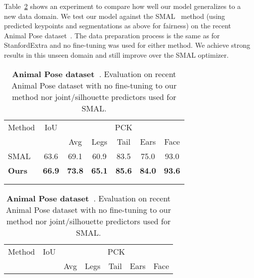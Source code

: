   Table~\ref{tab:animalpose} shows an experiment to compare how well our model generalizes to a new data domain. We test our model against the SMAL~\cite{DBLP:journals/corr/ZuffiKJB16} method (using predicted keypoints and segmentations as above for fairness) on the recent Animal Pose dataset~\cite{animalpose}. The data preparation process is the same as for StanfordExtra and no fine-tuning was used for either method. We achieve strong results in this unseen domain and still improve over the SMAL optimizer.
  
  \begin{table}[t!]
      \parbox{.45\linewidth}{
          \centering
          \begin{tabular}{@{}lcccccc@{}}
          \toprule
          \multicolumn{1}{l}{Method} & 
          \multicolumn{1}{c}{IoU} & 
          \multicolumn{5}{c}{PCK} \\
          \multicolumn{2}{c}{} &
          \multicolumn{1}{c}{Avg} &
          \multicolumn{1}{c}{Legs} &
          \multicolumn{1}{c}{Tail} &
          \multicolumn{1}{c}{Ears} &
          \multicolumn{1}{c}{Face} \\
          \midrule
          SMAL~\cite{DBLP:journals/corr/ZuffiKJB16} & 63.6 & 69.1 & 60.9 & 83.5 & 75.0 & 93.0 \\
          \textbf{Ours} & \textbf{66.9} & \textbf{73.8} & \textbf{65.1} & \textbf{85.6} & \textbf{84.0} & \textbf{93.6} \\
          \bottomrule
          \multicolumn{7}{c}{} \\
          \multicolumn{7}{c}{}
          \end{tabular}
          \vspace{1em}
          \caption{
              \label{tab:animalpose}
              \textbf{Animal Pose dataset~\cite{animalpose}}. Evaluation on recent Animal Pose dataset with no fine-tuning to our method nor joint/silhouette predictors used for SMAL.}
      }
      \hfill
      \parbox{.45\linewidth}{
          \centering
          \begin{tabular}{@{}lcccccc@{}}
          \toprule
          \multicolumn{1}{l}{Method} & 
          \multicolumn{1}{c}{IoU} & 
          \multicolumn{5}{c}{PCK} \\
          \multicolumn{2}{c}{} &
          \multicolumn{1}{c}{Avg} &
          \multicolumn{1}{c}{Legs} &
          \multicolumn{1}{c}{Tail} &
          \multicolumn{1}{c}{Ears} &
          \multicolumn{1}{c}{Face} \\

\end{tabular}}
\end{table}
